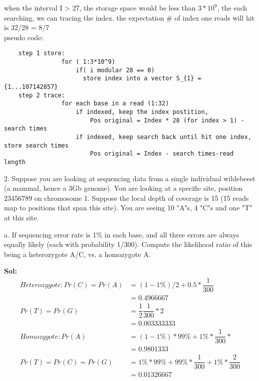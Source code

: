 \documentclass[a4paper,11pt]{article}
\begin{document}
when the interval I > 27, the storage space would be less than $3 * 10^{9}$, the each searching, we can tracing the index. the expectation $\#$ of index one reads will hit is 32/28 = 8/7\\


pseudo code: 
\begin{verbatim}
	step 1 store:
				for ( 1:3*10^9) 
					if( i modular 28 == 0) 
					  store index into a vector S_{1} = {1...107142857}
	step 2 trace: 
				for each base in a read (1:32)
					if indexed, keep the index postition, 
						Pos original = Index * 28 (for index > 1) - search times 
					if indexed, keep search back until hit one index, store search times  
						Pos original = Index - search times-read length 
\end{verbatim}

2.  Suppose you are looking at sequencing data from a single individual wildebeest (a mammal, hence a 3Gb genome). You are looking at a specific site, position 23456789 on chromosome 1. Suppose the local depth of coverage
is 15 (15 reads map to positions that span this site). You are seeing 10 "A"s, 4 "C"s and one "T" at this site.

a.  If sequencing error rate is 1\% in each base, and all three errors are always equally likely (each with probability 1/300). Compute the likelihood ratio of this being a heterozygote A/C, vs. a homozygote A.

\textbf{Sol:}
\begin{align}
 Heterozygote:  Pr(C) = Pr(A) &= (1-1\%)/2 + 0.5*\dfrac{1}{300}\\
                &= 0.4966667 \\
 				Pr(T) = Pr(G) &= \dfrac{1}{2}\dfrac{1}{300} * 2 \\
                 &= 0.003333333 \\
 Homozygote: Pr(A) &= (1- 1\%) * 99\% + 1\%*\dfrac{1}{300} *  \\
           &= 0.9801333 \\
 			 Pr(T) = Pr(C) = Pr(G) &= 1\% * 99\% + 99\% * \dfrac{1}{300} + 1\% * \dfrac{2}{300} \\
            &= 0.01326667 
\end{align}
\end{document}
